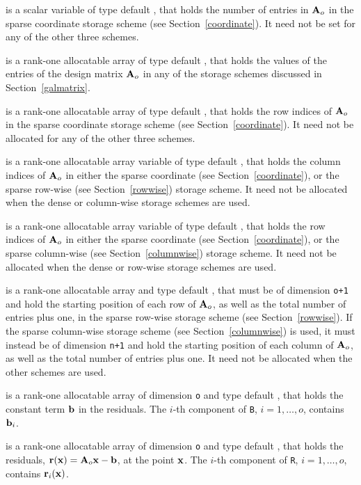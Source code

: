 \documentclass{galahad}
\begin{document}
\begin{description}
\begin{description}
 is a scalar variable of type default \integer, that
holds the number of entries in ${\mathbf{A}}_o$
in the sparse coordinate storage scheme (see Section~\ref{coordinate}).
It need not be set for any of the other three schemes.

 is a rank-one allocatable array of type default \realdp, that 
holds the values of the entries of the design matrix ${\mathbf{A}}_o$ in any of the
storage schemes discussed in Section~\ref{galmatrix}.

 is a rank-one allocatable array of type default \integer,
that holds the row indices of ${\mathbf{A}}_o$ in the sparse coordinate storage
scheme (see Section~\ref{coordinate}).
It need not be allocated for any of the other three schemes.

 is a rank-one allocatable array variable of type default \integer,
that holds the column indices of ${\mathbf{A}}_o$ in either the sparse coordinate
(see Section~\ref{coordinate}), or the sparse row-wise
(see Section~\ref{rowwise}) storage scheme.
It need not be allocated when the dense or column-wise storage schemes are used.

 is a rank-one allocatable array variable of type default \integer,
that holds the row indices of ${\mathbf{A}}_o$ in either the sparse coordinate
(see Section~\ref{coordinate}), or the sparse column-wise
(see Section~\ref{columnwise}) storage scheme.
It need not be allocated when the dense or row-wise storage schemes are used.

 is a rank-one allocatable array and type default \integer,
that must be of dimension {\tt o+1}
and hold the starting position of each row of ${\mathbf{A}}_o$, as well
as the total number of entries plus one, in the sparse row-wise storage
scheme (see Section~\ref{rowwise}).
If the sparse column-wise storage scheme (see Section~\ref{columnwise})
is used, it must instead be of dimension {\tt n+1}
and hold the starting position of each column of ${\mathbf{A}}_o$, as well
as the total number of entries plus one.
It need not be allocated when the
other schemes are used.

\end{description}

 is a rank-one allocatable array of dimension {\tt o} and type
default \realdp, that holds the constant term ${\mathbf{b}}$ in the residuals.
The $i$-th component of {\tt B}, $i = 1, \ldots, o$, contains ${\mathbf{b}}_{i}$.

 is a rank-one allocatable array of dimension {\tt o} and type
default \realdp, that holds the residuals, ${\mathbf{r}}({\mathbf{x}}) = {\mathbf{A}}_o {\mathbf{x}} - {\mathbf{b}}$,
at the point ${\mathbf{x}}$. The $i$-th component of
{\tt R}, $i = 1, \ldots, o$, contains ${\mathbf{r}}_{i}({\mathbf{x}})$.


\end{description}
\end{document}
